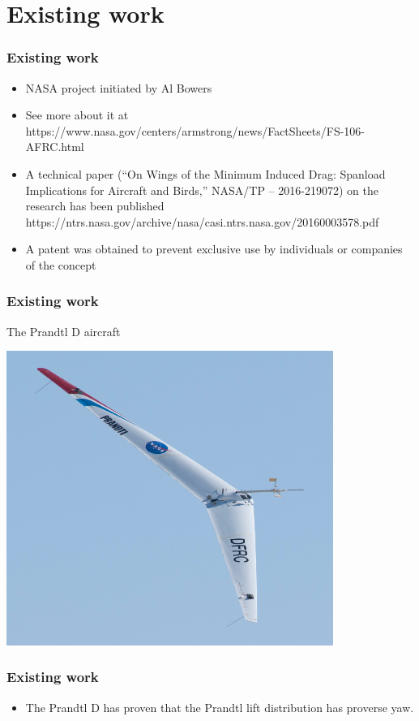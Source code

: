 \documentclass{beamer}
\begin{document}
\section{Existing work}


\begin{frame}
\frametitle{Existing work}
\begin{itemize}
\item NASA project initiated by Al Bowers
\item See more about it at https://www.nasa.gov/centers/armstrong/news/FactSheets/FS-106-AFRC.html
\item A technical paper (“On Wings of the Minimum Induced Drag: Spanload Implications for Aircraft and Birds,” NASA/TP – 2016-219072) on the research has been published
https://ntrs.nasa.gov/archive/nasa/casi.ntrs.nasa.gov/20160003578.pdf
\item A patent was obtained to prevent exclusive use by individuals or companies of the concept
\end{itemize}
\end{frame}


\begin{frame}
\frametitle{Existing work}

The Prandtl D aircraft

\includegraphics[width = 0.8\textwidth]{Pictures/PrandtlDflight.jpg}


\end{frame}


\begin{frame}
\frametitle{Existing work}
\begin{itemize}
\item The Prandtl D has proven that the Prandtl lift distribution has proverse yaw.
\end{itemize}
\end{frame}
\end{document}
